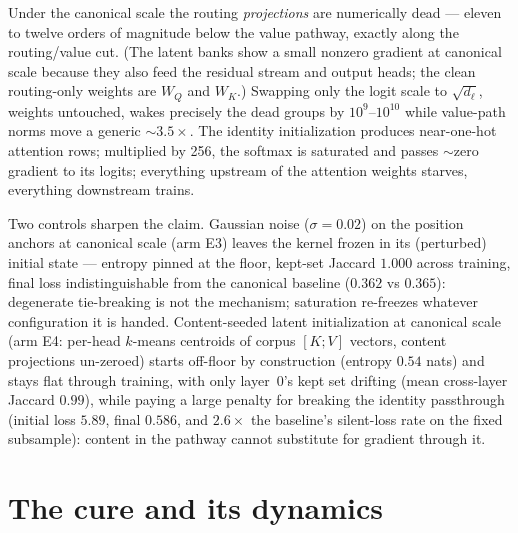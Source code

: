 \documentclass[11pt]{article}
\newcommand{\dl}{d_{\ell}}
\begin{document}
Under the canonical scale the routing \emph{projections} are numerically
dead --- eleven to twelve orders of magnitude below the value pathway,
exactly along the routing/value cut. (The latent banks show a small
nonzero gradient at canonical scale because they also feed the residual
stream and output heads; the clean routing-only weights are $W_Q$ and
$W_K$.) Swapping only the logit scale to $\sqrt{\dl}$, weights untouched,
wakes precisely the dead groups by $10^{9}$--$10^{10}$ while value-path
norms move a generic ${\sim}3.5\times$. The identity initialization
produces near-one-hot attention rows; multiplied by 256, the softmax is
saturated and passes ${\sim}$zero gradient to its logits; everything
upstream of the attention weights starves, everything downstream trains.

Two controls sharpen the claim. Gaussian noise ($\sigma{=}0.02$) on the
position anchors at canonical scale (arm E3) leaves the kernel frozen in
its (perturbed) initial state --- entropy pinned at the floor, kept-set
Jaccard $1.000$ across training, final loss indistinguishable from the
canonical baseline ($0.362$ vs $0.365$): degenerate tie-breaking is not
the mechanism; saturation re-freezes whatever configuration it is
handed. Content-seeded latent initialization at canonical scale (arm E4:
per-head $k$-means centroids of corpus $[K;V]$ vectors, content
projections un-zeroed) starts off-floor by construction (entropy
$0.54$ nats) and stays flat through training, with only layer~0's kept
set drifting (mean cross-layer Jaccard $0.99$), while paying a large
penalty for breaking the identity passthrough (initial loss $5.89$,
final $0.586$, and $2.6\times$ the baseline's silent-loss rate on the
fixed subsample): content in the pathway cannot substitute for gradient
through it.

\section{The cure and its dynamics}
\label{sec:cure}
\end{document}
